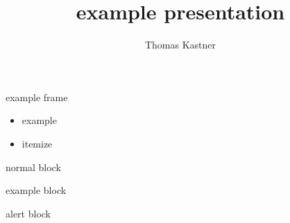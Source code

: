 \documentclass{beamer}
\title{example presentation}
\author{Thomas Kastner}
\begin{document}
    \begin{frame}[plain]
        \titlepage
    \end{frame}

    \begin{frame}{example frame}
        \begin{itemize}
          \item example
          \item itemize
        \end{itemize}

        \begin{block}{normal}
          block
        \end{block}

        \begin{exampleblock}{example}
          block
        \end{exampleblock}

        \begin{alertblock}{alert}
          block
        \end{alertblock}
    \end{frame}
\end{document}
